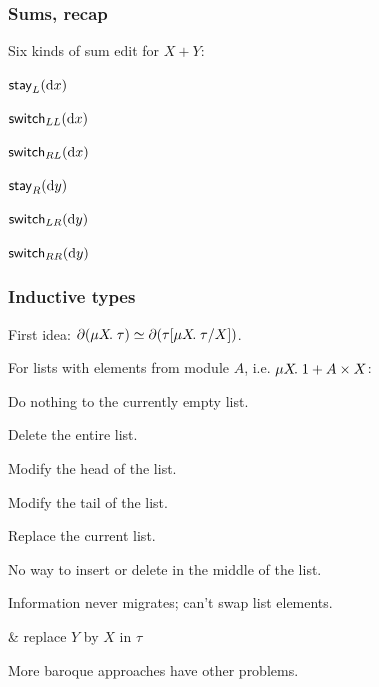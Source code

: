 \documentclass[table]{beamer}
\begin{document}
\begin{frame}
    \frametitle{Sums, recap}
    Six kinds of sum edit for $X + Y$:
    \begin{center}
        $\mathsf{stay}_L(\textrm{d} x)$

        $\mathsf{switch}_{LL}(\textrm{d} x)$

        $\mathsf{switch}_{RL}(\textrm{d} x)$

        \vspace{2ex}

        $\mathsf{stay}_R(\textrm{d} y)$

        $\mathsf{switch}_{LR}(\textrm{d} y)$

        $\mathsf{switch}_{RR}(\textrm{d} y)$
    \end{center}
\end{frame}


\begin{frame}
    \frametitle{Inductive types}
    First idea: $\partial(\mu X\!.\;\tau)\simeq\partial(\tau[\mu X\!.\;\tau/X])$.

    For lists with elements from module $A$, i.e. $\mu X\!.\;1+A \times X$:

    \begin{description}[$\mlstayr{\mlright\dx}$]
        \item[$\mlstayl\anything$] Do nothing to the currently empty list.
        \item[$\mlswitch_{\anything L}(\anything)$] Delete the entire list.
        \item[$\mlstayr{\mlleft{\d a}}$] Modify the head of the list.
        \item[$\mlstayr{\mlright\dx}$] Modify the tail of the list.
        \item[$\mlswitch_{\anything R}(\anything)$] Replace the current
            list.
    \end{description}

    \alert{No way to insert or delete in the middle of the list.}

    Information never migrates; can't swap list elements.

    \begin{pronunciation}
        \tau[X/Y] & replace $Y$ by $X$ in $\tau$
    \end{pronunciation}

    \pause

    More baroque approaches have other problems.
\end{frame}
\end{document}
